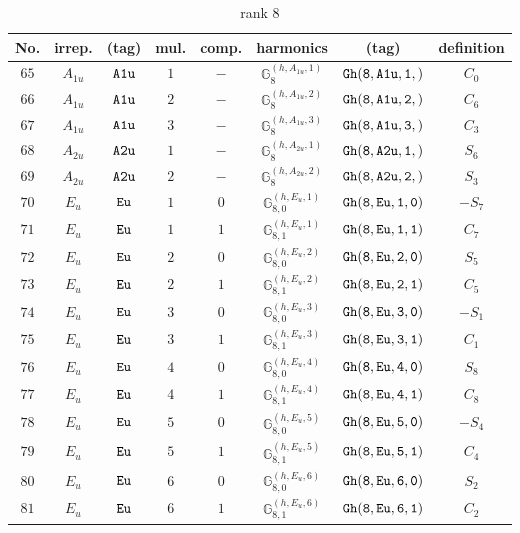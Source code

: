 \documentclass[fleqn,8pt]{jsarticle}
\begin{document}
\begin{table}[ht!]
\begin{center}
\caption{rank 8}
\renewcommand{\arraystretch}{1.3}
\begin{tabular}{cccccccc} \hline \hline
No. & irrep. & (tag) & mul. & comp. & harmonics & (tag) & definition \\ \hline
$ 65 $ & $ A_{1u} $ & $ {\tt A1u} $ & $ 1 $ & $ - $ & $ \mathbb{G}_{8}^{(h,A_{1u},1)} $ & $ {\tt Gh(8,A1u,1,)} $ & $ C_{0} $ \\
$ 66 $ & $ A_{1u} $ & $ {\tt A1u} $ & $ 2 $ & $ - $ & $ \mathbb{G}_{8}^{(h,A_{1u},2)} $ & $ {\tt Gh(8,A1u,2,)} $ & $ C_{6} $ \\
$ 67 $ & $ A_{1u} $ & $ {\tt A1u} $ & $ 3 $ & $ - $ & $ \mathbb{G}_{8}^{(h,A_{1u},3)} $ & $ {\tt Gh(8,A1u,3,)} $ & $ C_{3} $ \\
$ 68 $ & $ A_{2u} $ & $ {\tt A2u} $ & $ 1 $ & $ - $ & $ \mathbb{G}_{8}^{(h,A_{2u},1)} $ & $ {\tt Gh(8,A2u,1,)} $ & $ S_{6} $ \\
$ 69 $ & $ A_{2u} $ & $ {\tt A2u} $ & $ 2 $ & $ - $ & $ \mathbb{G}_{8}^{(h,A_{2u},2)} $ & $ {\tt Gh(8,A2u,2,)} $ & $ S_{3} $ \\
$ 70 $ & $ E_{u} $ & $ {\tt Eu} $ & $ 1 $ & $ 0 $ & $ \mathbb{G}_{8,0}^{(h,E_{u},1)} $ & $ {\tt Gh(8,Eu,1,0)} $ & $ - S_{7} $ \\
$ 71 $ & $ E_{u} $ & $ {\tt Eu} $ & $ 1 $ & $ 1 $ & $ \mathbb{G}_{8,1}^{(h,E_{u},1)} $ & $ {\tt Gh(8,Eu,1,1)} $ & $ C_{7} $ \\
$ 72 $ & $ E_{u} $ & $ {\tt Eu} $ & $ 2 $ & $ 0 $ & $ \mathbb{G}_{8,0}^{(h,E_{u},2)} $ & $ {\tt Gh(8,Eu,2,0)} $ & $ S_{5} $ \\
$ 73 $ & $ E_{u} $ & $ {\tt Eu} $ & $ 2 $ & $ 1 $ & $ \mathbb{G}_{8,1}^{(h,E_{u},2)} $ & $ {\tt Gh(8,Eu,2,1)} $ & $ C_{5} $ \\
$ 74 $ & $ E_{u} $ & $ {\tt Eu} $ & $ 3 $ & $ 0 $ & $ \mathbb{G}_{8,0}^{(h,E_{u},3)} $ & $ {\tt Gh(8,Eu,3,0)} $ & $ - S_{1} $ \\
$ 75 $ & $ E_{u} $ & $ {\tt Eu} $ & $ 3 $ & $ 1 $ & $ \mathbb{G}_{8,1}^{(h,E_{u},3)} $ & $ {\tt Gh(8,Eu,3,1)} $ & $ C_{1} $ \\
$ 76 $ & $ E_{u} $ & $ {\tt Eu} $ & $ 4 $ & $ 0 $ & $ \mathbb{G}_{8,0}^{(h,E_{u},4)} $ & $ {\tt Gh(8,Eu,4,0)} $ & $ S_{8} $ \\
$ 77 $ & $ E_{u} $ & $ {\tt Eu} $ & $ 4 $ & $ 1 $ & $ \mathbb{G}_{8,1}^{(h,E_{u},4)} $ & $ {\tt Gh(8,Eu,4,1)} $ & $ C_{8} $ \\
$ 78 $ & $ E_{u} $ & $ {\tt Eu} $ & $ 5 $ & $ 0 $ & $ \mathbb{G}_{8,0}^{(h,E_{u},5)} $ & $ {\tt Gh(8,Eu,5,0)} $ & $ - S_{4} $ \\
$ 79 $ & $ E_{u} $ & $ {\tt Eu} $ & $ 5 $ & $ 1 $ & $ \mathbb{G}_{8,1}^{(h,E_{u},5)} $ & $ {\tt Gh(8,Eu,5,1)} $ & $ C_{4} $ \\
$ 80 $ & $ E_{u} $ & $ {\tt Eu} $ & $ 6 $ & $ 0 $ & $ \mathbb{G}_{8,0}^{(h,E_{u},6)} $ & $ {\tt Gh(8,Eu,6,0)} $ & $ S_{2} $ \\
$ 81 $ & $ E_{u} $ & $ {\tt Eu} $ & $ 6 $ & $ 1 $ & $ \mathbb{G}_{8,1}^{(h,E_{u},6)} $ & $ {\tt Gh(8,Eu,6,1)} $ & $ C_{2} $ \\
 \hline \hline
\end{tabular}
\end{center}
\end{table}
\end{document}
